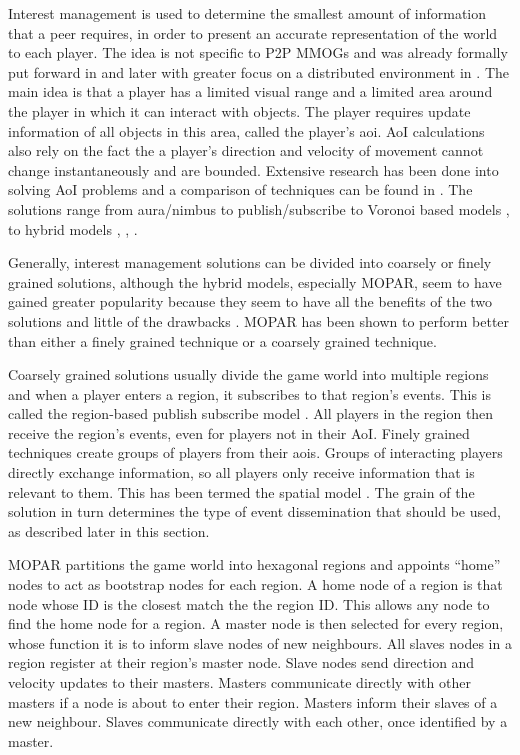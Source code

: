\documentclass[journal,oneside,a4paper,onecolumn]{IEEEtran}
\begin{document}
Interest management is used to determine the smallest amount of information that a peer requires, in order to present an accurate representation of the world to each player. The idea is not specific to P2P MMOGs and was already formally put forward in \cite{First_IM} and later with greater focus on a distributed environment in \cite{Whang_agent_based_IM}. The main idea is that a player has a limited visual range and a limited area around the player in which it can interact with objects. The player requires update information of all objects in this area, called the player's \ac{aoi}. AoI calculations also rely on the fact the a player's direction and velocity of movement cannot change instantaneously and are bounded. Extensive research has been done into solving AoI problems and a comparison of techniques can be found in \cite{Boulanger_IM_compare}. The solutions range from aura/nimbus \cite{Benford_spatial_IM} to publish/subscribe \cite{mercury_publish_subscribe} to Voronoi based models \cite{Hu_voronoi_IM}, \cite{Buyukkaya_voronoi_state_management} to hybrid models \cite{hybrid_IM}, \cite{MOPAR}, \cite{fan_mediator_paper}.

Generally, interest management solutions can be divided into coarsely or finely grained solutions, although the hybrid models, especially MOPAR, seem to have gained greater popularity because they seem to have all the benefits of the two solutions and little of the drawbacks \cite{MOPAR}. MOPAR has been shown to perform better than either a finely grained technique or a coarsely grained technique.

Coarsely grained solutions usually divide the game world into multiple regions and when a player enters a region, it subscribes to that region's events. This is called the region-based publish subscribe model \cite{Fan_deisgn_issues_p2p}. All players in the region then receive the region's events, even for players not in their AoI. Finely grained techniques create groups of players from their \acp{aoi}. Groups of interacting players directly exchange information, so all players only receive information that is relevant to them. This has been termed the spatial model \cite{Fan_deisgn_issues_p2p}. The grain of the solution in turn determines the type of event dissemination that should be used, as described later in this section.

MOPAR partitions the game world into hexagonal regions and appoints ``home'' nodes to act as bootstrap nodes for each region. A home node of a region is that node whose ID is the closest match the the region ID. This allows any node to find the home node for a region. A master node is then selected for every region, whose function it is to inform slave nodes of new neighbours. All slaves nodes in a region register at their region's master node. Slave nodes send direction and velocity updates to their masters. Masters communicate directly with other masters if a node is about to enter their region. Masters inform their slaves of a new neighbour. Slaves communicate directly with each other, once identified by a master.
\end{document}
